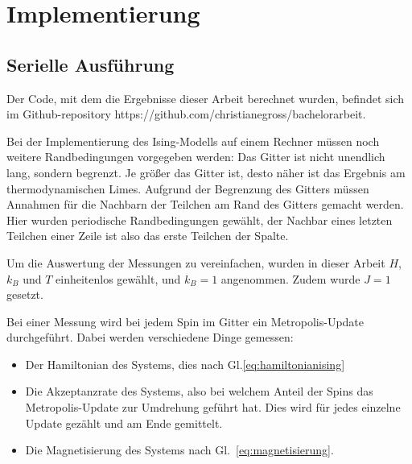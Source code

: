 	\chapter{Implementierung}
	\label{chap:implementierung}
	
	\section{Serielle Ausführung}
	\label{sec:seriellimplementierung}
	
	Der Code, mit dem die Ergebnisse dieser Arbeit berechnet wurden, befindet sich im Github-repository https://github.com/christianegross/bachelorarbeit. %
	
	Bei der Implementierung des Ising-Modells auf einem Rechner müssen noch weitere Randbedingungen vorgegeben werden:
	Das Gitter ist nicht unendlich lang, sondern begrenzt. Je größer das Gitter ist, desto näher ist das Ergebnis am thermodynamischen Limes. 
	Aufgrund der Begrenzung des Gitters müssen Annahmen für die Nachbarn der Teilchen am Rand des Gitters gemacht werden. Hier wurden periodische Randbedingungen gewählt, der Nachbar eines letzten Teilchen einer Zeile ist also das erste Teilchen der Spalte.
	
	Um die Auswertung der Messungen zu vereinfachen, wurden in dieser Arbeit $H$, $k_B$ und $T$ einheitenlos gewählt, und $k_B=1$ angenommen. Zudem wurde $J=1$ gesetzt.
	
	Bei einer Messung wird bei jedem Spin im Gitter ein Metropolis-Update durchgeführt. %
	Dabei werden verschiedene Dinge gemessen: \begin{itemize}
		\item Der Hamiltonian des Systems, dies nach Gl.\ref{eq:hamiltonianising}
		\item Die Akzeptanzrate des Systems, also bei welchem Anteil der Spins das Metropolis-Update zur Umdrehung geführt hat. Dies wird für jedes einzelne Update gezählt und am Ende gemittelt.
		\item Die Magnetisierung des Systems nach Gl.~\ref{eq:magnetisierung}. 
	\end{itemize}
	
